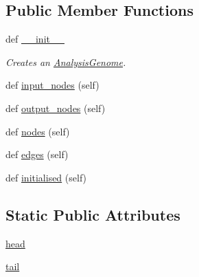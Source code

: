 \subsection*{Public Member Functions}
\begin{DoxyCompactItemize}
\item 
def \hyperlink{classNEAT__PyGenetics_1_1NEAT_1_1GenomeStructures_1_1AnalysisStructure_1_1AnalysisGenome_1_1AnalysisGenome_ade327b90f0ad5077a0864d5a7dfe705e}{\+\_\+\+\_\+init\+\_\+\+\_\+}
\begin{DoxyCompactList}\small\item\em Creates an \hyperlink{classNEAT__PyGenetics_1_1NEAT_1_1GenomeStructures_1_1AnalysisStructure_1_1AnalysisGenome_1_1AnalysisGenome}{Analysis\+Genome}. \end{DoxyCompactList}\item 
def \hyperlink{classNEAT__PyGenetics_1_1NEAT_1_1GenomeStructures_1_1AnalysisStructure_1_1AnalysisGenome_1_1AnalysisGenome_afde7a1abfb35596b72a79b5a1119acfd}{input\+\_\+nodes} (self)
\item 
def \hyperlink{classNEAT__PyGenetics_1_1NEAT_1_1GenomeStructures_1_1AnalysisStructure_1_1AnalysisGenome_1_1AnalysisGenome_afd38f7e3e579713434e6f7ad977ace57}{output\+\_\+nodes} (self)
\item 
def \hyperlink{classNEAT__PyGenetics_1_1NEAT_1_1GenomeStructures_1_1AnalysisStructure_1_1AnalysisGenome_1_1AnalysisGenome_a249bc4c5e9cbf9f5f4e9c7c4d6dcfc4b}{nodes} (self)
\item 
def \hyperlink{classNEAT__PyGenetics_1_1NEAT_1_1GenomeStructures_1_1AnalysisStructure_1_1AnalysisGenome_1_1AnalysisGenome_a4435fda98d49756abec987840f902abb}{edges} (self)
\item 
def \hyperlink{classNEAT__PyGenetics_1_1NEAT_1_1GenomeStructures_1_1AnalysisStructure_1_1AnalysisGenome_1_1AnalysisGenome_a0fead92350d58b2f5f078e7fa54e19e0}{initialised} (self)
\end{DoxyCompactItemize}
\subsection*{Static Public Attributes}
\begin{DoxyCompactItemize}
\item 
\hyperlink{classNEAT__PyGenetics_1_1NEAT_1_1GenomeStructures_1_1AnalysisStructure_1_1AnalysisGenome_1_1AnalysisGenome_a0738164ade43882c355f33037d133280}{head}
\item 
\hyperlink{classNEAT__PyGenetics_1_1NEAT_1_1GenomeStructures_1_1AnalysisStructure_1_1AnalysisGenome_1_1AnalysisGenome_a41704621b0d39e8476b95141dd1cf18d}{tail}
\end{DoxyCompactItemize}


